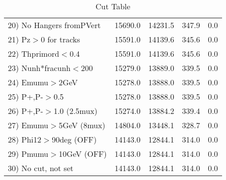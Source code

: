 \begin{table}[h!]
\begin{tabular}{||l||r|r|r|r||}
 20) No Hangers fromPVert &     15690.0 &     14231.5 &       347.9 &         0.0 \\
 21) Pz$>$0 for tracks    &     15591.0 &     14139.6 &       345.6 &         0.0 \\
 22) Thprimord$<$0.4      &     15591.0 &     14139.6 &       345.6 &         0.0 \\
 23) Nunh*fracunh$<$200   &     15279.0 &     13889.0 &       339.5 &         0.0 \\
 24) Emumu$>$2GeV         &     15278.0 &     13888.0 &       339.5 &         0.0 \\
 25) P+,P-$>$0.5          &     15278.0 &     13888.0 &       339.5 &         0.0 \\
 26) P+,P-$>$1.0 (2.5mux) &     15274.0 &     13884.2 &       339.4 &         0.0 \\
 27) Emumu$>$5GeV  (8mux) &     14804.0 &     13448.1 &       328.7 &         0.0 \\
 28) Phi12$>$90deg  (OFF) &     14143.0 &     12844.1 &       314.0 &         0.0 \\
 29) Pmumu$>$10GeV  (OFF) &     14143.0 &     12844.1 &       314.0 &         0.0 \\
 30) No cut, not set      &     14143.0 &     12844.1 &       314.0 &         0.0 \\
 \hline
 \hline
 \end{tabular}
 \caption{Cut Table \cohpip }
 \label{tab-cut_copip}
 \end{table}

